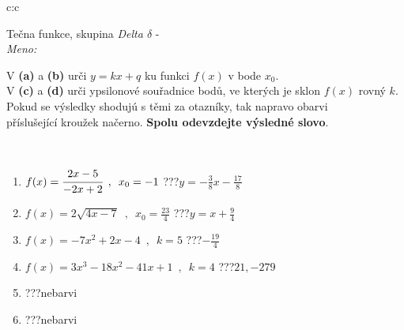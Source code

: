 \documentclass[10pt]{report}
\begin{document}
\newpage
\thispagestyle{empty}
\begin{tabular}{c:c}
\begin{minipage}[c][104.5mm][t]{0.5\linewidth}
\begin{center}
\vspace{7mm}
{\huge Tečna funkce, skupina \textit{Delta $\delta$} -}\\[5mm]
\textit{Meno:}\phantom{xxxxxxxxxxxxxxxxxxxxxxxxxxxxxxxxxxxxxxxxxxxxxxxxxxxxxxxxxxxxxxxxx}\\[5mm]
\begin{minipage}{0.95\linewidth}
\begin{center}
V \textbf{(a)} a \textbf{(b)} urči  $y = kx + q$ ku funkci $f(x)$ v bode $x_0$.\\V \textbf{(c)} a \textbf{(d)} urči ypsilonové souřadnice bodů, ve kterých je sklon $f(x)$ rovný $k$.\\Pokud se výsledky shodujú s těmi za otazníky, tak napravo obarvi\\příslušející kroužek načerno. \textbf{Spolu odevzdejte výsledné slovo}.
\end{center}
\end{minipage}
\\[1mm]
\begin{minipage}{0.79\linewidth}
\begin{center}
\begin{varwidth}{\linewidth}
\begin{enumerate}
\small
\item $f(x)=\cfrac{2x-5}{-2x+2}\enspace , \enspace x_0=-1$\quad \dotfill\; ???\;\dotfill \quad $y = -\frac{3}{8}x-\frac{17}{8}$
\item $f(x)=2\sqrt{4x-7}\enspace , \enspace x_0=\frac{23}{4}$\quad \dotfill\; ???\;\dotfill \quad $y = x+\frac{9}{4}$
\item $f(x)=-7x^2+2x-4\enspace , \enspace k=5$\quad \dotfill\; ???\;\dotfill \quad $-\frac{19}{4}$
\item $f(x)=3x^3-18x^2-41x+1\enspace , \enspace k=4$\quad \dotfill\; ???\;\dotfill \quad $21 , -279$
\item \quad \dotfill\; ???\;\dotfill \quad nebarvi
\item \quad \dotfill\; ???\;\dotfill \quad nebarvi
\end{enumerate}
\end{varwidth}
\end{center}
\end{minipage}
\begin{minipage}{0.20\linewidth}

\end{minipage}
\end{center}
\end{minipage}
\end{tabular}
\end{document}
